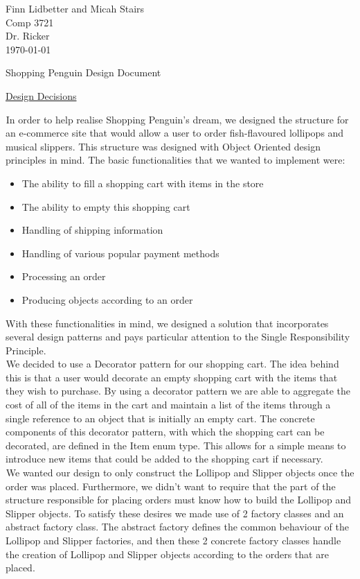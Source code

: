 \documentclass[letter paper, 12pt]{article}
\newcommand{\tab}{${}_{}$\hspace{0.2in}}
\begin{document}
\noindent Finn Lidbetter and Micah Stairs\\
Comp 3721\\
Dr. Ricker\\
\today \bigskip
\begin{center}
	{\Large Shopping Penguin Design Document}
\end{center}
\underline{Design Decisions}\vspace{5pt}

\tab In order to help realise Shopping Penguin's dream, we designed the structure for an e-commerce site that would allow a user to order fish-flavoured lollipops and musical slippers. This structure was designed with Object Oriented design principles in mind. The basic functionalities that we wanted to implement were:
\begin{itemize}
	\item The ability to fill a shopping cart with items in the store
	\item The ability to empty this shopping cart
	\item Handling of shipping information
	\item Handling of various popular payment methods
	\item Processing an order
	\item Producing objects according to an order
\end{itemize}
With these functionalities in mind, we designed a solution that incorporates several design patterns and pays particular attention to the Single Responsibility Principle. \\
\tab We decided to use a Decorator pattern for our shopping cart. The idea behind this is that a user would decorate an empty shopping cart with the items that they wish to purchase. By using a decorator pattern we are able to aggregate the cost of all of the items in the cart and maintain a list of the items through a single reference to an object that is initially an empty cart. The concrete components of this decorator pattern, with which the shopping cart can be decorated, are defined in the Item enum type. This allows for a simple means to introduce new items that could be added to the shopping cart if necessary.\\
\tab We wanted our design to only construct the Lollipop and Slipper objects once the order was placed. Furthermore, we didn't want to require that the part of the structure responsible for placing orders must know how to build the Lollipop and Slipper objects. To satisfy these desires we made use of 2 factory classes and an abstract factory class. The abstract factory defines the common behaviour of the Lollipop and Slipper factories, and then these 2 concrete factory classes handle the creation of Lollipop and Slipper objects according to the orders that are placed.
\end{document}
